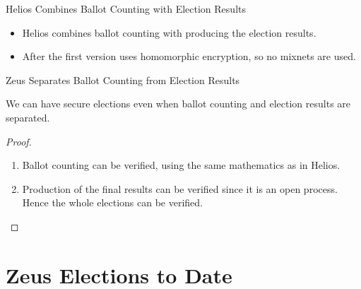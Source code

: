 \documentclass[utf8]{beamer}
\begin{document}
\begin{frame}{Helios Combines Ballot Counting with Election Results}

  \begin{itemize}
  \item Helios combines ballot counting with producing the election
    results.
  \item After the first version uses homomorphic encryption, so no
    mixnets are used.
  \end{itemize}

\end{frame}


\begin{frame}{Zeus Separates Ballot Counting from Election Results}
  
  \begin{theorem}
    We can have secure elections even when ballot counting and election
    results are separated.
  \end{theorem}

\begin{proof}
  \begin{enumerate}
  \item<1-> Ballot counting can be verified, using the same mathematics
    as in Helios.
  \item<2-> Production of the final results can be verified since it is
    an open process. Hence the whole elections can be verified.\qedhere
  \end{enumerate}
\end{proof}

\end{frame}

\section{Zeus Elections to Date}



  
\end{document}
